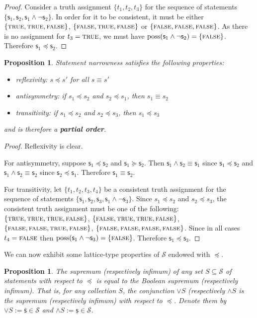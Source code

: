 \documentclass[psamsfonts]{amsart}
\newtheorem{prop}[thm]{Proposition}
\theoremstyle{definition}
\theoremstyle{remark}
\numberwithin{equation}{section}
\DeclareMathOperator{\possFn}{poss}
\def\TRUE{\textsc{true}}
\def\FALSE{\textsc{false}}
\def\stmtSet{\mathcal{S}}
\def\narrower{\preccurlyeq}
\def\broader{\succcurlyeq}
\def\AND{\wedge}
\def\OR{\vee}
\def\NOT{\neg}
\newcommand{\stmt}[1][s] {\mathsf{#1}}
\begin{document}
\begin{proof}
	Consider a truth assignment $\{t_1, t_2, t_3\}$ for the sequence of statements $\{\stmt_1, \stmt_2, \stmt_1 \AND \NOT\stmt_2\}$. In order for it to be consistent, it must be either $\{\TRUE, \TRUE, \FALSE\}$, $\{\FALSE, \TRUE, \FALSE\}$ or $\{\FALSE, \FALSE, \FALSE\}$. As there is no assignment for $t_3=\TRUE$, we must have $\possFn(\stmt_1 \AND \NOT\stmt_2) = \{\FALSE\}$. Therefore $\stmt_1 \narrower \stmt_2$.
\end{proof}


\begin{prop}
	Statement narrowness satisfies the following properties:
	\begin{itemize}
		\item reflexivity: $s \narrower s'$ for all $s\equiv s'$
		\item antisymmetry: if $s_1 \narrower s_2$ and  $s_2 \narrower s_1$, then $s_1 \equiv s_2$
		\item transitivity: if $s_1 \narrower s_2$ and $s_2 \narrower s_3$, then $s_1 \narrower s_3$
	\end{itemize}
	and is therefore a \textbf{partial order}.
\end{prop}
\begin{proof}
Reflexivity is clear. 
	
	For antisymmetry, suppose $\stmt_1 \narrower \stmt_2$ and $\stmt_1 \broader \stmt_2$. Then $\stmt_1 \AND \stmt_2 \equiv \stmt_1$ since $\stmt_1 \narrower \stmt_2$ and $\stmt_1 \AND \stmt_2 \equiv \stmt_2$ since $\stmt_2 \narrower \stmt_1$. Therefore $\stmt_1 \equiv \stmt_2$. 
	
	For transitivity, let $\{t_1, t_2, t_3, t_4\}$ be a consistent truth assignment for the sequence of statements $\{\stmt_1, \stmt_2, \stmt_3, \stmt_1 \AND \NOT\stmt_3\}$.  Since $s_1 \narrower s_2$ and $s_2 \narrower s_3$, the consistent truth assignment must be one of the following: $\{\TRUE, \TRUE, \TRUE, \FALSE\}$, $\{\FALSE, \TRUE, \TRUE, \FALSE\}$, $\{\FALSE, \FALSE, \TRUE, \FALSE\}$, $\{\FALSE, \FALSE, \FALSE, \FALSE\}$.
	Since in all cases $t_4=\FALSE$ then $\possFn(\stmt_1 \AND \NOT\stmt_3) = \{\FALSE\}$. Therefore $\stmt_1 \narrower \stmt_3$.
\end{proof}

We can now exhibit some lattice-type properties of $\mathcal{S}$ endowed with $\narrower$. 

\begin{prop}
The supremum (respectively infimum) of any set $S \subseteq \stmtSet$ of statements with respect to $\narrower$ is equal to the Boolean supremum (respectively infimum). That is, for any collection $S$, the conjunction $\OR S$ (respectively $\AND S$ is the supremum (respectively infimum) with respect to $\narrower$. Denote them by $\OR S := \bar{\stmt} \in \stmtSet$ and $\AND S := \underline{\stmt}\in\stmtSet$. 
\end{prop}
\end{document}
